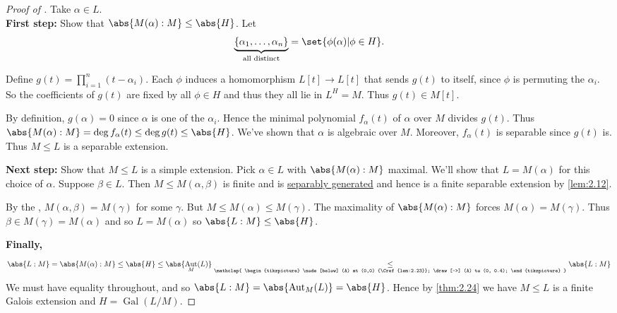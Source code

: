 \documentclass{article}
\DeclareMathOperator{\Aut}{Aut}
\DeclareMathOperator{\Gal}{Gal}
\begin{document}
\begin{proof}[Proof of ]
    Take $\alpha \in L$. \\
    \textbf{First step:} Show that $\abs{M(\alpha):M} \leq \abs{H}$.
    Let \begin{equation*}\underbrace{\{\alpha_1, \dotsc, \alpha_n\}}_{\text{all distinct}} = \set{\phi(\alpha) | \phi \in H}.\end{equation*}

    Define $g(t) = \prod_{i=1}^n (t-\alpha_i)$.
    Each $\phi$ induces a homomorphism $L[t] \to L[t]$ that sends $g(t)$ to itself, since $\phi$ is permuting the $\alpha_i$.
    So the coefficients of $g(t)$ are fixed by all $\phi \in H$ and thus they all lie in $L^H = M$.
    Thus $g(t) \in M[t]$.

    By definition, $g(\alpha) = 0$ since $\alpha$ is one of the $\alpha_i$.
    Hence the minimal polynomial $f_\alpha(t)$ of $\alpha$ over $M$ divides $g(t)$.
    Thus $\abs{M(\alpha):M} = \deg f_\alpha(t) \leq \deg g(t) \leq \abs{H}$.
    We've shown that $\alpha$ is algebraic over $M$.
    Moreover, $f_\alpha(t)$ is separable since $g(t)$ is.
    Thus $M \leq L$ is a separable extension.

    \textbf{Next step:} Show that $M \leq L$ is a simple extension.
    Pick $\alpha \in L$ with $\abs{M(\alpha):M}$ maximal.
    We'll show that $L = M(\alpha)$ for this choice of $\alpha$.
    Suppose $\beta \in L$. Then $M \leq M(\alpha, \beta)$ is finite and is \hyperlink{def:separableGen}{separably generated} and hence is a finite separable extension by \cref{lem:2.12}.

    By the , $M(\alpha, \beta) = M(\gamma)$ for some $\gamma$.
    But $M \leq M(\alpha) \leq M(\gamma)$.
    The maximality of $\abs{M(\alpha):M}$ forces $M(\alpha) = M(\gamma)$.
    Thus $\beta \in M(\gamma) = M(\alpha)$ and so $L = M(\alpha)$ so $\abs{L:M} \leq \abs{H}$.

    \textbf{Finally,}
    \begin{equation*}
        \abs{L:M} = \abs{M(\alpha):M} \leq \abs{H} \leq \abs{\Aut_M(L)} \underset{\mathclap{
        \begin{tikzpicture}
            \node[below] (A) at (0,0) {\Cref{lem:2.23}};
            \draw[->] (A) to (0, 0.4);
        \end{tikzpicture}
        }}{\leq} \abs{L:M}
    \end{equation*}
    We must have equality throughout, and so $\abs{L:M} = \abs{\Aut_M(L)} = \abs{H}$.
    Hence by \cref{thm:2.24} we have $M \leq L$ is a finite Galois extension and $H = \Gal(L/M)$.
\end{proof}
\end{document}
